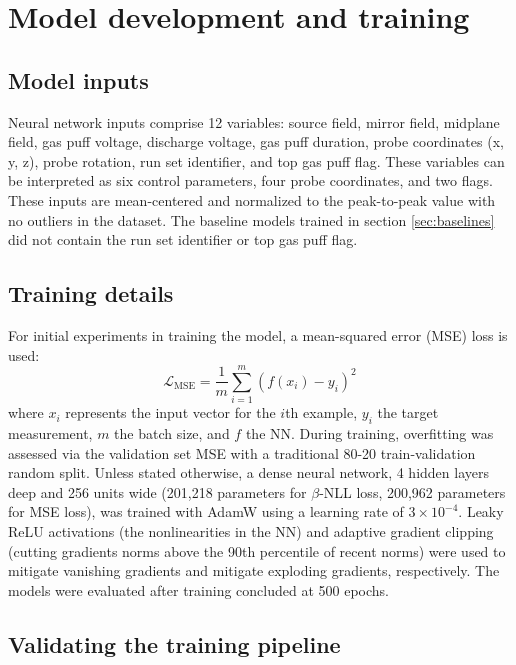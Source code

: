\section{Model development and training}
\label{sec:model_dev}

\subsection{Model inputs}

Neural network inputs comprise 12 variables: source field, mirror field, midplane field, gas puff voltage, discharge voltage, gas puff duration, probe coordinates (x, y, z), probe rotation, run set identifier, and top gas puff flag. These variables can be interpreted as six control parameters, four probe coordinates, and two flags. These inputs are mean-centered and normalized to the peak-to-peak value with no outliers in the dataset. The baseline models trained in section \ref{sec:baselines} did not contain the run set identifier or top gas puff flag.

\subsection{Training details}

For initial experiments in training the model, a mean-squared error (MSE) loss is used:
\begin{equation}
	\mathcal{L}_\text{MSE}=\frac{1}{m}\sum_{i=1}^m \left(f\left(x_i\right) - y_i \right)^2
\end{equation} 
where $x_i$ represents the input vector for the $i$th example, $y_i$ the target measurement, $m$ the batch size, and $f$ the NN. During training, overfitting was assessed via the validation set MSE with a traditional 80-20 train-validation random split. Unless stated otherwise, a dense neural network, 4 hidden layers deep and 256 units wide (201,218 parameters for $\beta$-NLL loss, 200,962 parameters for MSE loss), was trained with AdamW using a learning rate of $3\times10^{-4}$. Leaky ReLU activations (the nonlinearities in the NN) and adaptive gradient clipping\cite{seetharaman_autoclip_2020} (cutting gradients norms above the 90th percentile of recent norms) were used to mitigate vanishing gradients and mitigate exploding gradients, respectively. The models were evaluated after training concluded at 500 epochs.

\subsection{Validating the training pipeline}


